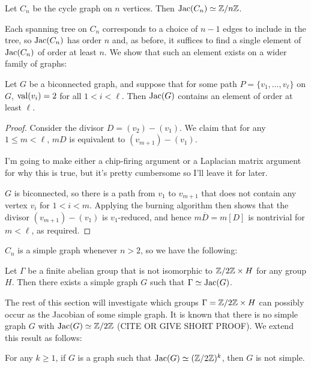 \documentclass{amsart}
\begin{document}
\begin{prop}
  \label{prop:cycle_cyclic}
  Let $C_n$ be the cycle graph on $n$ vertices. Then $\operatorname{Jac}(C_n) \simeq
  \mathbb{Z}/n\mathbb{Z}$.
\end{prop}

Each spanning tree on $C_n$ corresponds to a choice of $n-1$ edges to
include in the tree, so $\operatorname{Jac}(C_n)$ has order $n$ and, as before, it
suffices to find a single element of $\operatorname{Jac}(C_n)$ of order at least
$n$. We show that such an element exists on a wider family of graphs:

\begin{lem}
  \label{lem:2valent_path}
  Let $G$ be a biconnected graph, and suppose that for some path $P =
  \{v_1, \ldots, v_\ell\}$ on $G$, $\operatorname{val}(v_i) = 2$ for all $1 < i <
  \ell$. Then $\operatorname{Jac}(G)$ contains an element of order at least $\ell$.
\end{lem}
\begin{proof}
  Consider the divisor $D = (v_2) - (v_1)$. We claim that for any $1
  \le m < \ell$, $mD$ is equivalent to $(v_{m+1}) - (v_1)$.

  I'm going to make either a chip-firing argument or a Laplacian
  matrix argument for why this is true, but it's pretty cumbersome so
  I'll leave it for later.

  $G$ is biconnected, so there is a path from $v_1$ to $v_{m+1}$ that
  does not contain any vertex $v_i$ for $1 < i < m$. Applying the
  burning algorithm then shows that the divisor $(v_{m+1}) - (v_1)$ is
  $v_1$-reduced, and hence $m\overline{D} = m[D]$ is nontrivial for $m
  < \ell$, as required.
\end{proof}

$C_n$ is a simple graph whenever $n > 2$, so we have the following:

\begin{cor}
  Let $\Gamma$ be a finite abelian group that is not isomorphic to
  $\mathbb{Z}/2\mathbb{Z} \times H$ for any group $H$. Then there exists a simple
  graph $G$ such that $\Gamma \simeq \operatorname{Jac}(G)$.
\end{cor}

The rest of this section will investigate which groups $\Gamma =
\mathbb{Z}/2\mathbb{Z} \times H$ can possibly occur as the Jacobian of some simple
graph. It is known that there is no simple graph $G$ with $\operatorname{Jac}(G)
\simeq \mathbb{Z}/2\mathbb{Z}$ (CITE OR GIVE SHORT PROOF). We extend this result as
follows:

\begin{thm}
  \label{thm:2group}
  For any $k \ge 1$, if $G$ is a graph such that $\operatorname{Jac}(G) \simeq
  (\mathbb{Z}/2\mathbb{Z})^k$, then $G$ is not simple.
\end{thm}
\end{document}
